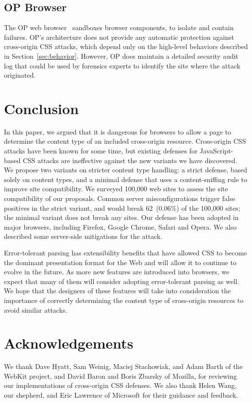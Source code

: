 \documentclass{sig-alternate}
\begin{document}
\subsection{OP Browser}
The OP web browser~\cite{op-browser} sandboxes browser components, to
isolate and contain failures.  OP's architecture does not provide any
automatic protection against cross-origin CSS attacks, which depend
only on the high-level behaviors described in
Section~\ref{sec:behavior}.  However, OP does maintain a detailed
security audit log that could be used by forensics experts to identify
the site where the attack originated.

\section{Conclusion} \label{sec:conclusion}
In this paper, we argued that it is dangerous for browsers to allow a page
to determine the content type of an included cross-origin resource.
Cross-origin CSS attacks have been known for some time, but
existing defenses for JavaScript-based CSS attacks are ineffective against
the new variants we have discovered. We propose two variants on 
stricter content type handling: a strict defense, based solely on content
types, and a minimal defense that uses a content-sniffing rule to improve
site compatibility.  We surveyed 100,000 web sites to assess the site
compatibility of our proposals.  Common server misconfigurations
trigger false positives in the strict variant, and would break
62~(0.06\%) of the 100,000 sites; the minimal variant does not break
any sites.  Our defense has been adopted in major browsers, including
Firefox, Google Chrome, Safari and Opera.
We also described some server-side mitigations for the attack.

Error-tolerant parsing has extensibility benefits that have allowed CSS to
become the dominant presentation format for the Web and will allow it to
continue to evolve in the future. As more new features are introduced into
browsers, we expect that many of them will consider adopting error-tolerant
parsing as well. We hope that the designers of these features will
take into consideration the importance of correctly determining the content
type of cross-origin resources to avoid similar attacks.

\section*{Acknowledgements}

We thank Dave Hyatt, Sam Weinig, Maciej Stachowiak, and Adam Barth of the
WebKit project, and David Baron and Boris Zbarsky of Mozilla, for reviewing
our implementations of cross-origin CSS defenses. We also thank 
Helen Wang, our shepherd, and Eric Lawrence of Microsoft for their
guidance and feedback.


\end{document}
